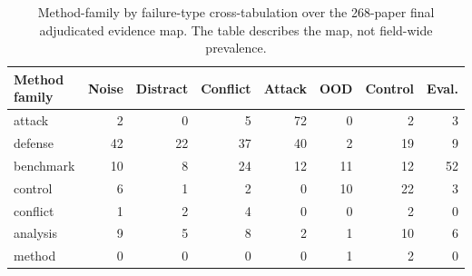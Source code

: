 \begin{table}[t]
\centering
\scriptsize
\begin{tabular}{lrrrrrrr}
\toprule
\textbf{Method family} & Noise & Distract & Conflict & Attack & OOD & Control & Eval. \\ 
\midrule
attack & 2 & 0 & 5 & 72 & 0 & 2 & 3 \\ 
defense & 42 & 22 & 37 & 40 & 2 & 19 & 9 \\ 
benchmark & 10 & 8 & 24 & 12 & 11 & 12 & 52 \\ 
control & 6 & 1 & 2 & 0 & 10 & 22 & 3 \\ 
conflict & 1 & 2 & 4 & 0 & 0 & 2 & 0 \\ 
analysis & 9 & 5 & 8 & 2 & 1 & 10 & 6 \\ 
method & 0 & 0 & 0 & 0 & 1 & 2 & 0 \\ 
\bottomrule
\end{tabular}
\caption{Method-family by failure-type cross-tabulation over the 268-paper final adjudicated evidence map. The table describes the map, not field-wide prevalence.}
\label{tab:method-failure-crosstab}
\end{table}

